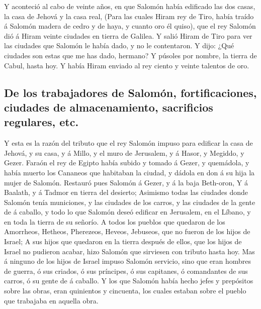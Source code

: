  Y aconteció al cabo de veinte años, en que Salomón había
edificado las dos casas, la casa de Jehová y la casa real, 
(Para las cuales Hiram rey de Tiro, había traído á Salomón madera de
cedro y de haya, y cuanto oro él quiso), que el rey Salomón dió á Hiram
veinte ciudades en tierra de Galilea.  Y salió Hiram de
Tiro para ver las ciudades que Salomón le había dado, y no le
contentaron.  Y dijo: ¿Qué ciudades son estas que me has
dado, hermano? Y púsoles por nombre, la tierra de Cabul, hasta hoy.
 Y había Hiram enviado al rey ciento y veinte talentos de
oro.

\hypertarget{de-los-trabajadores-de-salomuxf3n-fortificaciones-ciudades-de-almacenamiento-sacrificios-regulares-etc.}{%
\subsection{De los trabajadores de Salomón, fortificaciones, ciudades de
almacenamiento, sacrificios regulares,
etc.}\label{de-los-trabajadores-de-salomuxf3n-fortificaciones-ciudades-de-almacenamiento-sacrificios-regulares-etc.}}

 Y esta es la razón del tributo que el rey Salomón impuso
para edificar la casa de Jehová, y su casa, y á Millo, y el muro de
Jerusalem, y á Hasor, y Megiddo, y Gezer.  Faraón el rey de
Egipto había subido y tomado á Gezer, y quemádola, y había muerto los
Cananeos que habitaban la ciudad, y dádola en don á su hija la mujer de
Salomón.  Restauró pues Salomón á Gezer, y á la baja
Beth-oron,  Y á Baalath, y á Tadmor en tierra del desierto;
 Asimismo todas las ciudades donde Salomón tenía
municiones, y las ciudades de los carros, y las ciudades de la gente de
á caballo, y todo lo que Salomón deseó edificar en Jerusalem, en el
Líbano, y en toda la tierra de su señorío.  A todos los
pueblos que quedaron de los Amorrheos, Hetheos, Pherezeos, Heveos,
Jebuseos, que no fueron de los hijos de Israel;  A sus
hijos que quedaron en la tierra después de ellos, que los hijos de
Israel no pudieron acabar, hizo Salomón que sirviesen con tributo hasta
hoy.  Mas á ninguno de los hijos de Israel impuso Salomón
servicio, sino que eran hombres de guerra, ó sus criados, ó sus
príncipes, ó sus capitanes, ó comandantes de sus carros, ó su gente de á
caballo.  Y los que Salomón había hecho jefes y prepósitos
sobre las obras, eran quinientos y cincuenta, los cuales estaban sobre
el pueblo que trabajaba en aquella obra.

